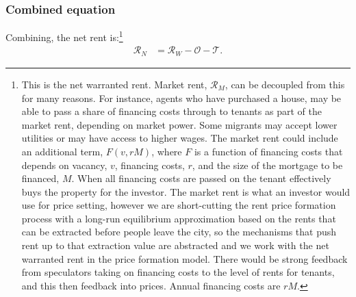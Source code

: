 \subsubsection{Combined equation}
Combining, the \gls{net rent} is:\footnote{This is the net warranted rent. Market rent, $\mathcal{R}_M$, can be decoupled from this for many reasons. For instance, agents who have purchased a house, may be able to pass a share of financing costs through to tenants as part of the market rent, depending on market power. Some  migrants may accept lower utilities or may have access to higher wages. The market rent could include an additional term, $F(v, rM)$, where $F$ is a function of financing costs that depends on %
vacancy, $v$, financing costs, $r$, and the size of the mortgage to be financed, $M$. When all financing costs are passed on the tenant effectively buys the property for the investor. The market rent is what an investor would use for price setting, however we are short-cutting the rent price formation process with a long-run equilibrium approximation based on the rents that can be extracted before people leave the city, so the mechanisms that push rent up to that extraction value are abstracted and we work with the net warranted rent in the price formation model. There would be strong feedback from speculators taking on financing costs  to the level of rents for tenants, and this  then feedback into prices. %
% 
Annual financing costs are $rM$. 
}
\begin{align}
\mathcal{R}_N &= \mathcal{R}_W - \mathcal{O} - \mathcal{T}.
\end{align}

